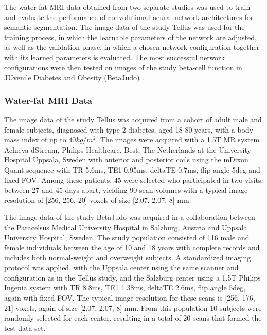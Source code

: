 \documentclass[10pt,letterpaper]{article}
\begin{document}
	The water-fat MRI data obtained from two separate studies was used to train and evaluate the performance of convolutional neural network architectures for semantic segmentation. The image data of the study Tellus was used for the training process, in which the learnable parameters of the network are adjusted, as well as the validation phase, in which a chosen network configuration together with its learned parameters is evaluated. The most successful network configurations were then tested on images of the study beta-cell function in JUvenile Diabetes and Obesity (BetaJudo) \cite{staaf2017pancreatic}. \\

	\subsubsection*{Water-fat MRI Data}

	The image data of the study Tellus was acquired from a cohort of adult male and female subjects, diagnosed with type 2 diabetes, aged 18-80 years, with a body mass index of up to $40kg/m^2$. The images were acquired with a 1.5T MR system Achieva dStream, Philips Healthcare, Best, The Netherlands at the University Hospital Uppsala, Sweden with anterior and posterior coils using the mDixon Quant sequence with TR 5.6ms, TE1 0.95ms, deltaTE 0.7ms, flip angle 5deg and fixed FOV. Among these patients, 45 were selected who participated in two visits, between 27 and 45 days apart, yielding 90 scan volumes with a typical image resolution of [256, 256, 20] voxels of size [2.07, 2.07, 8] mm.

	The image data of the study BetaJudo \cite{staaf2017pancreatic} was acquired in a collaboration between the Paracelsus Medical University Hospital in Salzburg, Austria and Uppsala University Hospital, Sweden. The study population consisted of 116 male and female individuals between the age of 10 and 18 years with complete records and includes both normal-weight and overweight subjects. A standardized imaging protocol was applied, with the Uppsala center using the same scanner and configuration as in the Tellus study, and the Salzburg center using a 1.5T Philips Ingenia system with TR 8.8ms, TE1 1.38ms, deltaTE 2.6ms, flip angle 5deg, again with fixed FOV. The typical image resolution for these scans is [256, 176, 21] voxels, again of size [2.07, 2.07, 8] mm. From this population 10 subjects were randomly selected for each center, resulting in a total of 20 scans that formed the test data set. \\
\end{document}

